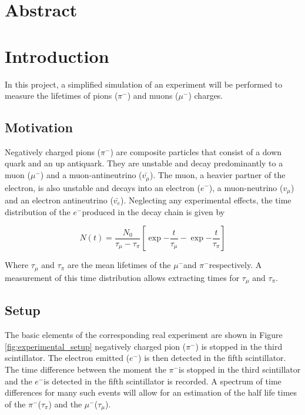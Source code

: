 \documentclass[11pt, a4paper, oneside]{book}
\newcommand{\electron}{$e^{-}$}
\newcommand{\pion}{$\pi^{-}$}
\newcommand{\muon}{$\mu^{-}$}
\begin{document}

\frontmatter

\tableofcontents
\mainmatter

\chapter{Abstract}

\chapter{Introduction}
In this project, a simplified simulation of an experiment will be performed to measure the lifetimes of pions (\pion) and muons (\muon) charges.

\section{Motivation}
Negatively charged pions (\pion) are composite particles that consist of a down quark and an up antiquark. They are unstable and decay predominantly to a muon (\muon) and a muon-antineutrino ($\bar{v_{\mu}}$). The muon, a heavier partner of the electron, is also unstable and decays into an electron (\electron), a muon-neutrino ($v_{\mu}$) and an electron antineutrino ($\bar{v_{e}}$). Neglecting any experimental effects, the time distribution of the \electron produced in the decay chain is given by

\begin{equation}
    N(t) = \frac{N_0}{\tau_{\mu} - \tau_{\pi}}  \left[ \exp{-\frac{t}{\tau_{\mu}}} - \exp{-\frac{t}{\tau_{\pi}}} \right]
    \label{eq:decay_chain_equation}
\end{equation}



Where $\tau_{\mu}$ and $\tau_{\pi}$ are the mean lifetimes of the \muon and \pion respectively. A measurement of this time distribution allows extracting times for $\tau_{\mu}$ and $\tau_{\pi}$.

\section{Setup}

The basic elements of the corresponding real experiment are shown in Figure \ref{fig:experimental_setup} negatively charged pion (\pion) is stopped in the third scintillator. The electron emitted (\electron) is then detected in the fifth scintillator. The time difference between the moment the \pion is stopped in the third scintillator and the \electron is detected in the fifth scintillator is recorded. A spectrum of time differences for many such events will allow for an estimation of the half life times of the \pion ($\tau_{\pi}$) and the \muon ($\tau_{\mu}$).
\end{document}
